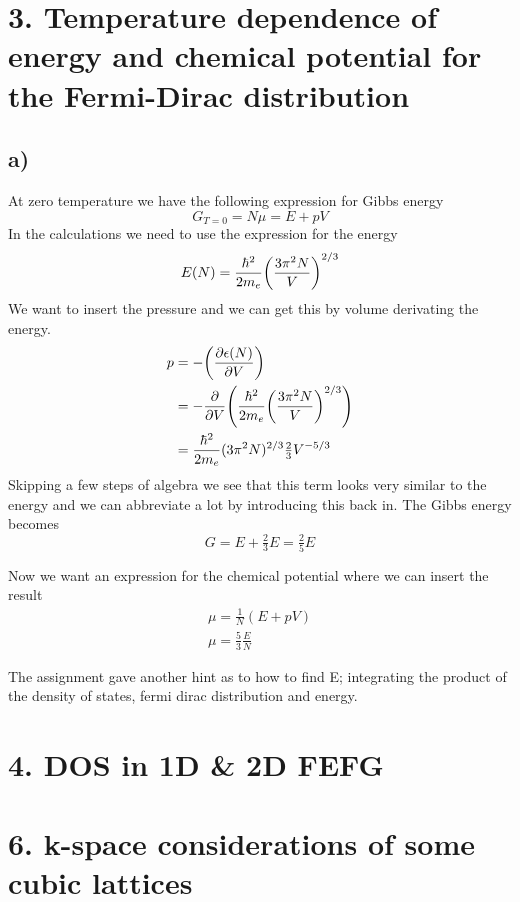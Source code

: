 \documentclass{article}
\begin{document}
\newpage
\section*{3. Temperature dependence of energy and chemical potential for the Fermi-Dirac distribution}
\subsection*{a)}
At zero temperature we have the following expression for Gibbs energy
\begin{equation*}
	G_{T=0}=N\mu=E+pV
\end{equation*}
In the calculations we need to use the expression for the energy
\begin{equation}
	E(N) = \frac{\hbar^2}{2m_e}\qty(\frac{3\pi^2N}{V})^{2/3}
\end{equation}
We want to insert the pressure and we can get this by volume derivating the energy.
\begin{align*}
	p &= -\qty(\pdv{\epsilon(N)}{V})\\
	&=-\pdv{}{V}\qty( \frac{\hbar^2}{2m_e}\qty(\frac{3\pi^2N}{V})^{2/3}  )\\
	&= \frac{\hbar^2}{2m_e}(3\pi^2N)^{2/3} \tfrac{2}{3}V^{-5/3}
\end{align*}
Skipping a few steps of algebra we see that this term looks very similar to the energy and we can abbreviate a lot by introducing this back in. The Gibbs energy becomes
\begin{equation*}
	G = E + \tfrac{2}{3}E = \tfrac{2}{5}E
\end{equation*}

Now we want an expression for the chemical potential where we can insert the result
\begin{align*}
	\mu = \frac{1}{N}(E+pV)\\
	\mu = \frac{5}{3}\frac{E}{N}
\end{align*}

The assignment gave another hint as to how to find E; integrating the product of the density of states, fermi dirac distribution and energy. 

\newpage
\section*{4. DOS in 1D \& 2D FEFG}

\newpage
\section*{ 6. k-space considerations of some cubic lattices }
\end{document}
